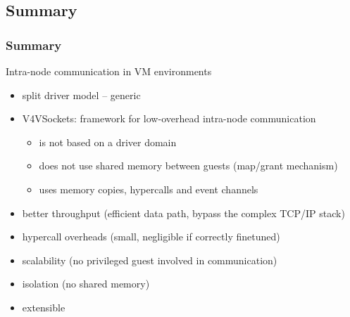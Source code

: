 \documentclass[red,slidestop,notes,compress,mathserif]{beamer}
\begin{document}
\subsection*{Summary}

\begin{frame}
\frametitle{Summary}
\begin{block}{Intra-node communication in VM environments}
\begin{itemize}
\item split driver model -- generic
\item V4VSockets: framework for low-overhead intra-node communication
\begin{itemize}
\item is not based on a driver domain
\item does not use shared memory between guests (map/grant mechanism)
\item uses memory copies, hypercalls and event channels
\end{itemize}
\end{itemize}
\end{block}
\begin{itemize}
\item better throughput (efficient data path, bypass the complex TCP/IP stack)
\item hypercall overheads (small, negligible if correctly finetuned)
\item scalability (no privileged guest involved in communication)
\item isolation (no shared memory)
\item extensible %
\end{itemize}
\end{frame}
\end{document}
